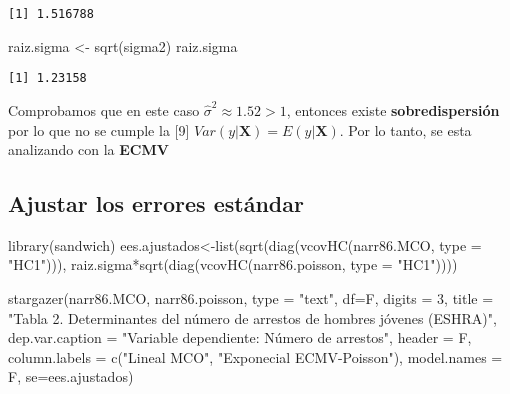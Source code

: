 \documentclass[
  letterpaper,
  DIV=11,
  numbers=noendperiod]{scrreprt}
\newenvironment{Shaded}{\begin{snugshade}}{\end{snugshade}}
\newcommand{\AttributeTok}[1]{\textcolor[rgb]{0.40,0.45,0.13}{#1}}
\newcommand{\DecValTok}[1]{\textcolor[rgb]{0.68,0.00,0.00}{#1}}
\newcommand{\FunctionTok}[1]{\textcolor[rgb]{0.28,0.35,0.67}{#1}}
\newcommand{\NormalTok}[1]{\textcolor[rgb]{0.00,0.23,0.31}{#1}}
\newcommand{\OtherTok}[1]{\textcolor[rgb]{0.00,0.23,0.31}{#1}}
\newcommand{\SpecialCharTok}[1]{\textcolor[rgb]{0.37,0.37,0.37}{#1}}
\newcommand{\StringTok}[1]{\textcolor[rgb]{0.13,0.47,0.30}{#1}}
\begin{document}
\begin{verbatim}
[1] 1.516788
\end{verbatim}

\begin{Shaded}
\begin{Highlighting}[]
\NormalTok{raiz.sigma }\OtherTok{\textless{}{-}} \FunctionTok{sqrt}\NormalTok{(sigma2)}
\NormalTok{raiz.sigma}
\end{Highlighting}
\end{Shaded}

\begin{verbatim}
[1] 1.23158
\end{verbatim}

Comprobamos que en este caso \(\widehat{\sigma}^2\approx1.52>1\),
entonces existe \textbf{sobredispersión} por lo que no se cumple la
{[}9{]} \(Var(y|\mathbf{X})=E(y|\mathbf{X})\). Por lo tanto, se esta
analizando con la \textbf{ECMV}

\subsection{Ajustar los errores
estándar}\label{ajustar-los-errores-estuxe1ndar}

\begin{Shaded}
\begin{Highlighting}[]
\FunctionTok{library}\NormalTok{(sandwich)}
\NormalTok{ees.ajustados}\OtherTok{\textless{}{-}}\FunctionTok{list}\NormalTok{(}\FunctionTok{sqrt}\NormalTok{(}\FunctionTok{diag}\NormalTok{(}\FunctionTok{vcovHC}\NormalTok{(narr86.MCO, }\AttributeTok{type =} \StringTok{"HC1"}\NormalTok{))),}
\NormalTok{                    raiz.sigma}\SpecialCharTok{*}\FunctionTok{sqrt}\NormalTok{(}\FunctionTok{diag}\NormalTok{(}\FunctionTok{vcovHC}\NormalTok{(narr86.poisson, }\AttributeTok{type =} \StringTok{"HC1"}\NormalTok{))))}

\FunctionTok{stargazer}\NormalTok{(narr86.MCO, narr86.poisson, }
          \AttributeTok{type =} \StringTok{"text"}\NormalTok{,}
          \AttributeTok{df=}\NormalTok{F,}
          \AttributeTok{digits =} \DecValTok{3}\NormalTok{,}
          \AttributeTok{title =} \StringTok{"Tabla 2. Determinantes del número de arrestos de hombres jóvenes (ESHRA)"}\NormalTok{,}
          \AttributeTok{dep.var.caption =} \StringTok{"Variable dependiente: Número de arrestos"}\NormalTok{,}
          \AttributeTok{header =}\NormalTok{ F,}
          \AttributeTok{column.labels =} \FunctionTok{c}\NormalTok{(}\StringTok{"Lineal MCO"}\NormalTok{, }\StringTok{"Exponecial ECMV{-}Poisson"}\NormalTok{),}
          \AttributeTok{model.names =}\NormalTok{ F,}
          \AttributeTok{se=}\NormalTok{ees.ajustados)}
\end{Highlighting}
\end{Shaded}
\end{document}
